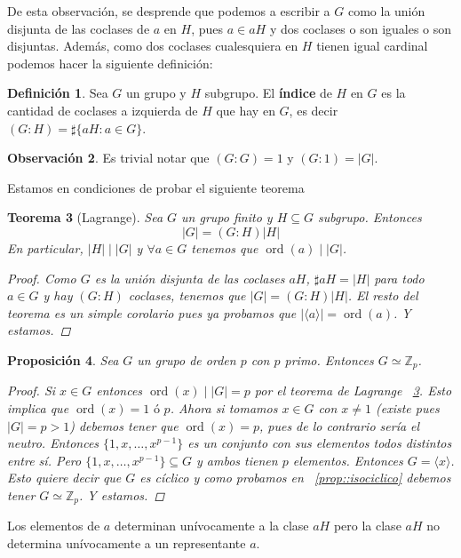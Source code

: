 \documentclass[12pt]{book}
\newtheorem{teo}{Teorema}[section]
\newtheorem{prop}[teo]{Proposición}
\theoremstyle{definition}
\newtheorem{obs}[teo]{Observación}
\newtheorem{defn}[teo]{Definición}
\newcommand{\ZZ}{\mathbb{Z}}      %
\DeclareMathOperator{\ord}{ord}
\begin{document}
De esta observación, se desprende que podemos a escribir a $G$ como la unión disjunta de las coclases de $a$ en $H$, pues $a\in aH$ y dos coclases o son iguales o son disjuntas. Además, como dos coclases cualesquiera en $H$ tienen igual cardinal podemos hacer la siguiente definición:

\begin{defn}
Sea $G$ un grupo y $H$ subgrupo. El \textbf{índice} de $H$ en $G$ es la cantidad de coclases a izquierda de $H$ que hay en $G$, es decir $(G:H)=\sharp\{aH : a\in G\}$.
\end{defn}

\begin{obs} Es trivial notar que $(G:G)=1$ y $(G:1)=|G|$.
\end{obs}

Estamos en condiciones de probar el siguiente teorema
\begin{teo}[Lagrange] \label{teo::lagrange} Sea $G$ un grupo finito y $H\subseteq G$ subgrupo. Entonces $$|G|=(G:H)|H|$$ En particular, $|H|\mid |G|$ y $\forall a\in G$ tenemos que $\ord(a)\mid |G|$.
\begin{proof}
Como $G$ es la unión disjunta de las coclases $aH$, $\sharp aH = |H|$ para todo $a\in G$ y hay $(G:H)$ coclases, tenemos que $|G|=(G:H)|H|$. El resto del teorema es un simple corolario pues ya probamos que $|\langle a\rangle| = \ord(a)$. Y estamos.
\end{proof}
\end{teo}

\begin{prop}
Sea $G$ un grupo de orden $p$ con $p$ primo. Entonces $G\simeq \ZZ_p$.
\begin{proof}
Si $x\in G$ entonces $\ord(x)\mid |G|=p$ por el teorema de Lagrange ~\ref{teo::lagrange}. Esto implica que $\ord(x)=1 \text{ ó } p$. Ahora si tomamos $x\in G$ con $x\neq 1$ (existe pues $|G|=p>1$) debemos tener que $\ord(x)=p$, pues de lo contrario sería el neutro. Entonces $\{1,x,\ldots , x^{p-1}\}$ es un conjunto con sus elementos todos distintos entre sí. Pero $\{1,x,\ldots , x^{p-1}\}\subseteq G$ y ambos tienen $p$ elementos. Entonces $G= \langle x\rangle$. Esto quiere decir que $G$ es cíclico y como probamos en ~\ref{prop::isociclico} debemos tener $G\simeq \ZZ_p$. Y estamos.
\end{proof}
\end{prop}

Los elementos de $a$ determinan unívocamente a la clase $aH$ pero la clase $aH$ no determina unívocamente a un representante $a$.
\end{document}

